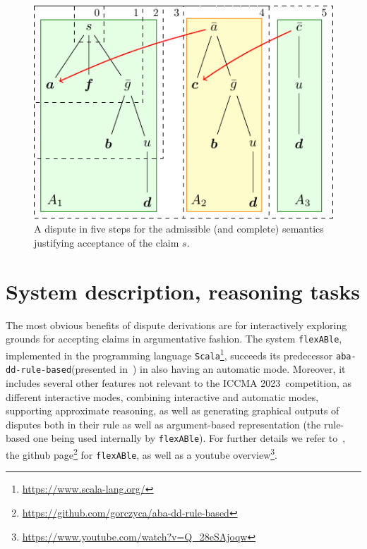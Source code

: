 \documentclass[conference]{IEEEtran}
\newcommand{\abaddrule}{\texttt{aba-dd-rule-based}\xspace}
\newcommand{\flexable}{\texttt{flexABle}\xspace}
\newcommand{\scala}{\texttt{Scala}\xspace}
\newcommand{\iccma}{ICCMA 2023}
\begin{document}
\begin{figure}
    \centering
      \centering
      \includegraphics[scale=0.8]{diagrams/diagram.pdf}
      \caption{A dispute in five steps for the admissible (and complete) semantics justifying acceptance of the claim $s$.}

    \label{fig:diagrams}
  \end{figure}




\section{System description, reasoning tasks}

The most obvious benefits of dispute derivations are for interactively exploring grounds for accepting claims in argumentative fashion.  %
The system \flexable, implemented in the programming language \scala\footnote{\url{https://www.scala-lang.org/}}, succeeds its predecessor \abaddrule (presented in~\cite{DillerGG21}) in also having an automatic mode. Moreover, it includes several other features not relevant to the \iccma~competition, as different interactive modes, combining interactive and automatic modes, supporting approximate reasoning, as well as generating graphical outputs of disputes both in their rule as well as argument-based representation (the rule-based one being used internally by \flexable).  For further details we refer to~\cite{gor22}, the github page\footnote{\url{https://github.com/gorczyca/aba-dd-rule-based}} for \flexable, as well as a youtube overview\footnote{\url{https://www.youtube.com/watch?v=Q_28eSAjoqw}}.
\end{document}
